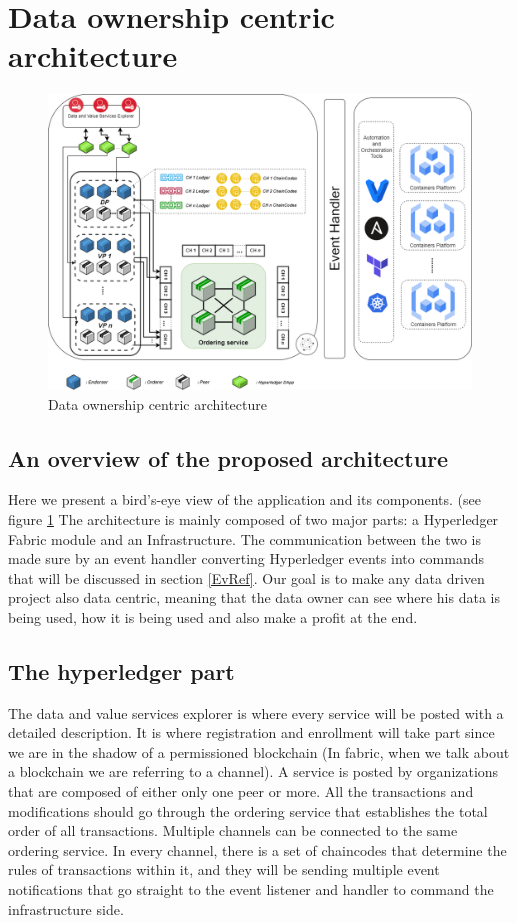 \documentclass[conference]{IEEEtran}
\begin{document}
\section{Data ownership centric architecture}

\begin{figure}[!htb]
  \includegraphics[width=\textwidth]{arch.png}
  \caption{Data ownership centric architecture}
  \label{arch}
\end{figure}


\subsection{An overview of the proposed architecture}
Here we present a bird’s-eye view of the application and its components. (see figure \ref{arch}
The architecture is mainly composed of two major parts: a Hyperledger Fabric module and an Infrastructure. The communication between the two is made sure by an event handler converting Hyperledger events into commands that will be discussed in section \ref{EvRef}. Our goal is to make any data driven project also data centric, meaning that the data owner can see where his data is being used, how it is being used and also make a profit at the end.

\subsection{The hyperledger part}
The data and value services explorer is where every service will be posted with a detailed description. It is where registration and enrollment will take part since we are in the shadow of a permissioned blockchain (In fabric, when we talk about a blockchain we are referring to a channel). A service is posted by organizations that are composed of either only one peer or more. All the transactions and modifications should go through the ordering service that establishes the total order of all transactions. Multiple channels can be connected to the same ordering service.
In every channel, there is a set of chaincodes that determine the rules of transactions within it, and they will be sending multiple event notifications that go straight to the event listener and handler to command the infrastructure side.
\end{document}
